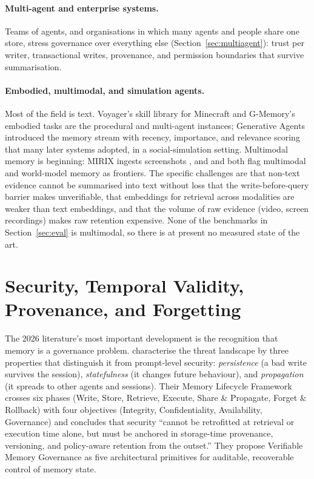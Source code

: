 \documentclass[11pt]{article}
\begin{document}
\paragraph{Multi-agent and enterprise systems.} Teams of agents, and organisations in which many agents and people share one store, stress governance over everything else (Section~\ref{sec:multiagent}): trust per writer, transactional writes, provenance, and permission boundaries that survive summarisation.

\paragraph{Embodied, multimodal, and simulation agents.} Most of the field is text. Voyager's skill library for Minecraft \citep{wang2023voyager} and G-Memory's embodied tasks \citep{zhang2025gmemory} are the procedural and multi-agent instances; Generative Agents \citep{park2023generative} introduced the memory stream with recency, importance, and relevance scoring that many later systems adopted, in a social-simulation setting. Multimodal memory is beginning: MIRIX ingests screenshots \citep{wang2025mirix}, and \citet{luo2026storage} and \citet{hu2025memoryage} both flag multimodal and world-model memory as frontiers. The specific challenges are that non-text evidence cannot be summarised into text without loss that the write-before-query barrier makes unverifiable, that embeddings for retrieval across modalities are weaker than text embeddings, and that the volume of raw evidence (video, screen recordings) makes raw retention expensive. None of the benchmarks in Section~\ref{sec:eval} is multimodal, so there is at present no measured state of the art.

\section{Security, Temporal Validity, Provenance, and Forgetting}
\label{sec:security}

The 2026 literature's most important development is the recognition that memory is a governance problem. \citet{lin2026security} characterise the threat landscape by three properties that distinguish it from prompt-level security: \emph{persistence} (a bad write survives the session), \emph{statefulness} (it changes future behaviour), and \emph{propagation} (it spreads to other agents and sessions). Their Memory Lifecycle Framework crosses six phases (Write, Store, Retrieve, Execute, Share \& Propagate, Forget \& Rollback) with four objectives (Integrity, Confidentiality, Availability, Governance) and concludes that security ``cannot be retrofitted at retrieval or execution time alone, but must be anchored in storage-time provenance, versioning, and policy-aware retention from the outset.'' They propose Verifiable Memory Governance as five architectural primitives for auditable, recoverable control of memory state.
\end{document}
